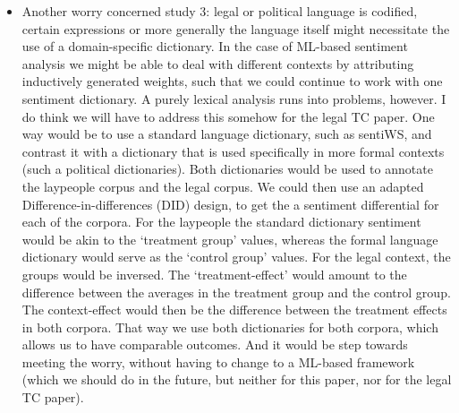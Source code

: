 \documentclass{article}
\begin{document}
\begin{itemize}
\item Another worry concerned study 3: legal or political language is codified, certain expressions or more generally the language itself might necessitate the use of a domain-specific dictionary. In the case of ML-based sentiment analysis we might be able to deal with different contexts by attributing inductively generated weights, such that we could continue to work with one sentiment dictionary. A purely lexical analysis runs into problems, however. I do think we will have to address this somehow for the legal TC paper. One way would be to use a standard language dictionary, such as sentiWS, and contrast it with a dictionary that is used specifically in more formal contexts (such a political dictionaries). Both dictionaries would be used to annotate the laypeople corpus and the legal corpus. We could then use an adapted Difference-in-differences (DID) design, to get the a sentiment differential for each of the corpora. For the laypeople the standard dictionary sentiment would be akin to the `treatment group' values, whereas the formal language dictionary would serve as the `control group' values. For the legal context, the groups would be inversed.  The `treatment-effect' would amount to the difference between the averages in the treatment group and the control group. The context-effect would then be the difference between the treatment effects in both corpora. That way we use both dictionaries for both corpora, which allows us to have comparable outcomes. And it would be step towards meeting the worry, without having to change to a ML-based framework (which we should do in the future, but neither for this paper, nor for the legal TC paper). 

\end{itemize}
\end{document}
